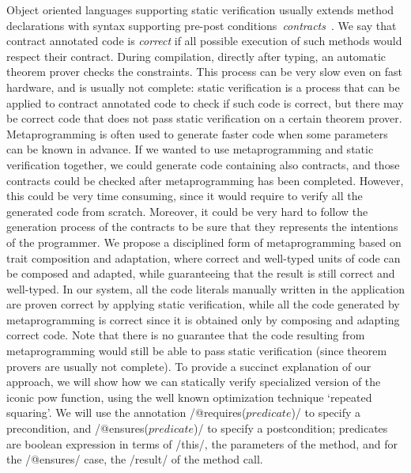 Object oriented languages supporting static verification usually extends method declarations
with syntax supporting pre-post conditions~\emph{contracts}~\cite{Meyer:1988:OSC:534929}.
We say that contract annotated code is \emph{correct} if all possible execution of such methods
would respect their contract.
During compilation, directly after typing, an automatic theorem prover
checks the constraints. This process can be very slow even on fast hardware, and is usually
not complete: static verification is a process that can be applied to contract annotated code
to check if such code is correct, but there may be correct code that does not pass static verification
 on a certain theorem prover.
Metaprogramming is often used to generate faster code when some parameters can be known in advance.
If we wanted to use metaprogramming and static verification together, we could generate code
containing also contracts, and those contracts could be checked after metaprogramming has been completed.
However, this could be very time consuming, since it would require to verify 
all the generated code from scratch.
Moreover, it could be very hard to follow the generation process of the contracts to be sure that they
represents the intentions of the programmer.
We propose a disciplined form of metaprogramming based on trait composition and adaptation,
where correct and well-typed units of code can be composed and adapted,
while guaranteeing that the result is still correct and well-typed.
In our system, all the code literals manually written in the application
are proven correct by applying static verification, while 
all the code generated by metaprogramming is correct since it is obtained only by composing
and adapting correct code.
Note that there is no guarantee that the code resulting from metaprogramming would still be able
to pass static verification (since theorem provers are usually not complete).
To provide a succinct explanation of our approach, we will show how we can statically verify specialized version
of the iconic pow function, using the 
well known optimization technique `repeated squaring'.
We will use the annotation /@requires($predicate$)/ 
to specify a precondition, and /@ensures($predicate$)/ 
to specify a postcondition; predicates are boolean expression in terms of /this/,
the parameters of the method, and for the /@ensures/ case,
the /result/ of the method call.

